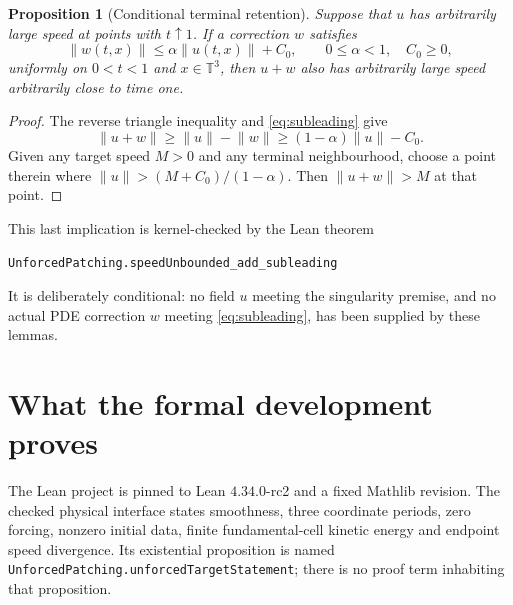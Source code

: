 \documentclass[11pt,a4paper]{article}
\theoremstyle{plain}
\newtheorem{proposition}[theorem]{Proposition}
\theoremstyle{definition}
\newcommand{\T}{\mathbb{T}^{3}}
\newcommand{\norm}[1]{\lVert #1\rVert}
\begin{document}
\begin{proposition}[Conditional terminal retention]\label{prop:ret}
Suppose that $u$ has arbitrarily large speed at points with
$t\uparrow1$. If a correction $w$ satisfies
\begin{equation}\label{eq:subleading}
 \norm{w(t,x)}\le\alpha\norm{u(t,x)}+C_0,
 \qquad 0\le\alpha<1,\quad C_0\ge0,
\end{equation}
uniformly on $0<t<1$ and $x\in\T$, then $u+w$ also has
arbitrarily large speed arbitrarily close to time one.
\end{proposition}

\begin{proof}
The reverse triangle inequality and \eqref{eq:subleading} give
\[
 \norm{u+w}\ge\norm{u}-\norm{w}
 \ge(1-\alpha)\norm{u}-C_0.
\]
Given any target speed $M>0$ and any terminal neighbourhood,
choose a point therein where
$\norm{u}>(M+C_0)/(1-\alpha)$.
Then $\norm{u+w}>M$ at that point.
\end{proof}

This last implication is kernel-checked by the Lean theorem
\begin{center}
\small\texttt{UnforcedPatching.speedUnbounded\_add\_subleading}
\end{center}
It is deliberately conditional: no field $u$ meeting the singularity
premise, and no actual PDE correction $w$ meeting
\eqref{eq:subleading}, has been supplied by these lemmas.

\section{What the formal development proves}

The Lean project is pinned to Lean $4.34.0$-rc2 and a fixed Mathlib
revision. The checked physical interface states smoothness, three
coordinate periods, zero forcing, nonzero initial data, finite
fundamental-cell kinetic energy and endpoint speed divergence. Its
existential proposition is named
\texttt{UnforcedPatching.unforcedTargetStatement}; there is no proof
term inhabiting that proposition.
\end{document}

